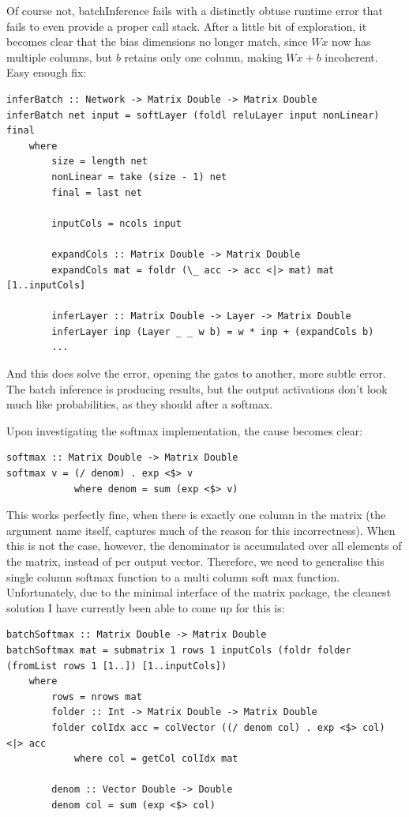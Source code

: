 \documentclass[12pt]{article}
\begin{document}
Of course not, batchInference fails with a distinctly obtuse runtime error that fails to even provide a proper call stack. After a little bit of exploration, it becomes clear that the bias dimensions no longer match, since $Wx$ now has multiple columns, but $b$ retains only one column, making $Wx + b$ incoherent. Easy enough fix:
\begin{lstlisting}
inferBatch :: Network -> Matrix Double -> Matrix Double
inferBatch net input = softLayer (foldl reluLayer input nonLinear) final
	where
		size = length net
		nonLinear = take (size - 1) net
		final = last net

		inputCols = ncols input

        expandCols :: Matrix Double -> Matrix Double
        expandCols mat = foldr (\_ acc -> acc <|> mat) mat [1..inputCols]

		inferLayer :: Matrix Double -> Layer -> Matrix Double
		inferLayer inp (Layer _ _ w b) = w * inp + (expandCols b)
		...
\end{lstlisting}
And this does solve the error, opening the gates to another, more subtle error. The batch inference is producing results, but the output activations don't look much like probabilities, as they should after a softmax.\bigskip

Upon investigating the softmax implementation, the cause becomes clear:
\begin{lstlisting}
softmax :: Matrix Double -> Matrix Double
softmax v = (/ denom) . exp <$> v
			where denom = sum (exp <$> v)	
\end{lstlisting}
This works perfectly fine, when there is exactly one column in the matrix (the argument name itself, captures much of the reason for this incorrectness). When this is not the case, however, the denominator is accumulated over all elements of the matrix, instead of per output vector. Therefore, we need to generalise this single column softmax function to a multi column soft max function. Unfortunately, due to the minimal interface of the matrix package, the cleanest solution I have currently been able to come up for this is:
\begin{lstlisting}
batchSoftmax :: Matrix Double -> Matrix Double
batchSoftmax mat = submatrix 1 rows 1 inputCols (foldr folder (fromList rows 1 [1..]) [1..inputCols])
	where
		rows = nrows mat
		folder :: Int -> Matrix Double -> Matrix Double
		folder colIdx acc = colVector ((/ denom col) . exp <$> col) <|> acc
			where col = getCol colIdx mat

		denom :: Vector Double -> Double
		denom col = sum (exp <$> col)
\end{lstlisting}
\end{document}
